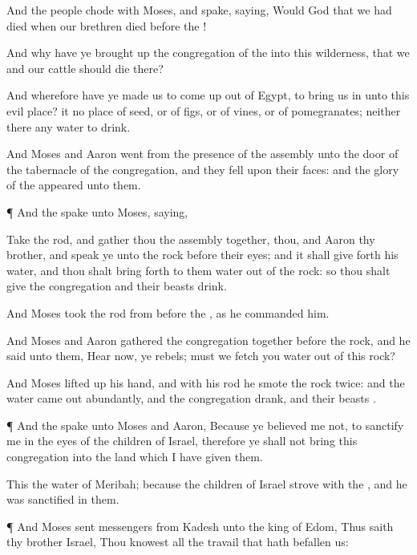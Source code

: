 {And the
people
chode with
Moses, and
spake,
saying, Would God
that we had
died when our
brethren
died
before the
{}!

And why have ye brought
up the
congregation of the
{} into this
wilderness, that we and our
cattle should
die there?

And wherefore have ye made us to come
up out of
Egypt, to
bring us in unto this
evil
place? it
{} no
place of
seed, or of
figs, or of
vines, or of
pomegranates; neither
{} there any
water to
drink.

And
Moses and
Aaron
went from the
presence of the
assembly unto the
door of the
tabernacle of the
congregation, and they
fell upon their
faces: and the
glory of the
{}
appeared unto them.


\par }{\PP {}¶ And the
{}
spake unto
Moses,
saying,

Take the
rod, and
gather thou the
assembly together, thou, and
Aaron thy
brother, and
speak ye unto the
rock before their
eyes; and it shall give
forth his
water, and thou shalt bring
forth to them
water out of the
rock: so thou shalt
give the
congregation and their
beasts
drink.

And
Moses
took the
rod from
before the
{}, as he
commanded him.

And
Moses and
Aaron
gathered the
congregation together
before the
rock, and he
said unto them,
Hear now, ye
rebels; must we
fetch you
water out of this
rock?

And
Moses lifted
up his
hand, and with his
rod he
smote the
rock
twice: and the
water came
out
abundantly, and the
congregation
drank, and their
beasts
{}.


\par }{\PP {}¶ And the
{}
spake unto
Moses and
Aaron, Because ye
believed me not, to
sanctify me in the
eyes of the
children of
Israel, therefore ye shall not
bring this
congregation into the
land which I have
given them.

This
{} the
water of
Meribah; because the
children of
Israel
strove with the
{}, and he was
sanctified in them.


\par }{\PP {}¶ And
Moses
sent
messengers from
Kadesh unto the
king of
Edom, Thus
saith thy
brother
Israel, Thou
knowest all the
travail that hath
befallen us:

}
